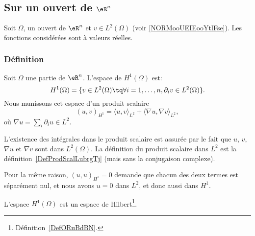 \subsection{Sur un ouvert de \( \eR^n\)}

Soit \( \Omega\), un ouvert de \( \eR^n\) et \( v\in L^2(\Omega)\) (voir \ref{NORMooUEIEooYtlFse}). Les fonctions considérées sont à valeurs réelles.


\subsubsection{Définition}

\begin{definition}
    Soit \( \Omega\) une partie de \( \eR^n\). L'espace de  \( H^1(\Omega)\) est:
    \begin{equation}
        H^1(\Omega)=\{ v\in L^2(\Omega)\tq \forall i=1,\ldots, n, \partial_iv\in L^2(\Omega) \}.
    \end{equation}
    Nous munissons cet espace d'un produit scalaire
    \begin{equation}        \label{EQooQRMKooLaMpcp}
        (u,v)_{H^1}=\langle u, v\rangle_{L^2}+\langle \nabla u, \nabla v\rangle_{L^2},
    \end{equation}
    où \( \nabla u=\sum_i\partial_iu\in L^2\).
\end{definition}
L'existence des intégrales dans le produit scalaire est assurée par le fait que \( u\), \( v\), \( \nabla u\) et \( \nabla v\) sont dans \( L^2(\Omega)\). La définition du produit scalaire dans \( L^2\) est la définition~\ref{DefProdScalLubrgTj} (mais sans la conjugaison complexe).

Pour la même raison, \( (u,u)_{H^1}=0\) demande que chacun des deux termes est séparément nul, et nous avons \( u=0\) dans \( L^2\), et donc aussi dans \( H^1\).

\begin{theorem}
    L'espace \( H^1(\Omega)\) est un espace de Hilbert\footnote{Définition~\ref{DefORuBdBN}.}.
\end{theorem}

